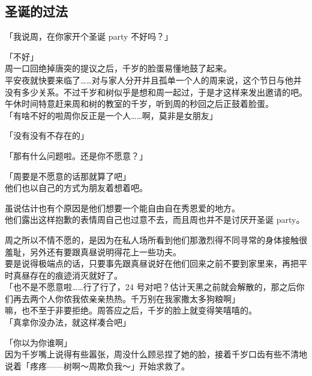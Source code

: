 \subsection{圣诞的过法}

「我说周，在你家开个圣诞 party 不好吗？」

「不好」\\

周一口回绝掉唐突的提议之后，千岁的脸蛋易懂地鼓了起来。\\

平安夜就快要来临了……对与家人分开并且孤单一个人的周来说，这个节日与他并没有多少关系。不过千岁和树似乎是想和周一起过，于是才这样来发出邀请的吧。\\

午休时间特意赶来周和树的教室的千岁，听到周的秒回之后正鼓着脸蛋。\\

「有啥不好的啦周你反正是一个人……啊，莫非是女朋友」

「没有没有不存在的」

「那有什么问题啦。还是你不愿意？」

「周要是不愿意的话那就算了吧」\\

他们也以自己的方式为朋友着想着吧。

虽说估计也有个原因是他们想要一个能自由自在秀恩爱的地方。\\

他们露出这样抱歉的表情周自己也过意不去，而且周也并不是讨厌开圣诞 party。

周之所以不情不愿的，是因为在私人场所看到他们那激烈得不同寻常的身体接触很羞耻，另外还有要跟真昼说明得花上一些功夫。\\

要是说得极端点的话，只要事先跟真昼说好在他们回来之前不要到家里来，再把平时真昼存在的痕迹消灭就好了。\\

「也不是不愿意啦……行了行了，24 号对吧？估计天黑之前就会解散的，那之后你们再去两个人你侬我侬亲亲热热。千万别在我家撒太多狗粮啊」\\

嘛，也不至于非要拒绝。周答应之后，千岁的脸上就变得笑嘻嘻的。\\

「真拿你没办法，就这样凑合吧」

「你以为你谁啊」\\

因为千岁嘴上说得有些嚣张，周没什么顾忌捏了她的脸，接着千岁口齿有些不清地说着「疼疼——树啊～周欺负我～」开始求救了。\\

